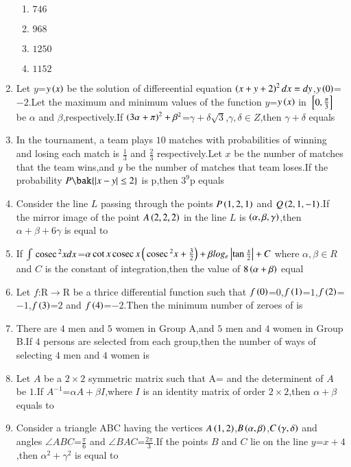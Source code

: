 \documentclass[journal]{IEEEtran}
\begin{document}
\begin{enumerate}[start=16]
    \begin{enumerate}
        \item $746$
        \item $968$
        \item $1250$
        \item $1152$
    \end{enumerate}
    \item Let $y$=$y\left(x\right)$ be the solution of differeential equation $\left(x+y+2\right)^2dx=dy$,$y\left(0\right)$=$-2$.Let the maximum and minimum values of the function $y$=$y\left(x\right)$ in ${}\left[0,\frac{\pi}{3}\right]$ be $\alpha$ and $\beta$,respectively.If $\left(3\alpha+\pi\right)^2+\beta^2$=$\gamma+\delta\sqrt{3}$,$\gamma,\delta \in Z$,then $\gamma+\delta$ equals
    \item In the tournament, a team plays $10$ matches with probabilities of winning and losing each match is $\frac{1}{3}$ and $\frac{2}{3}$ respectively.Let $x$ be the number of matches that the team wins,and $y$ be the number of matches that team loses.If the probability $P\bak{\abs{x-y} \leq 2}$ is p,then $3^9$p equals
    \item Consider the line $L$ passing through the points $P\left(1,2,1\right)$ and $Q\left(2,1,-1\right)$.If the mirror image of the point $A\left(2,2,2\right)$ in the line $L$ is $\left(\alpha,\beta,\gamma\right)$,then $\alpha+\beta+6\gamma$ is equal to
    \item If $\int\,\text{cosec}\,^2{x}dx$=$\alpha\cot{x}\,\text{cosec}\,{x}\left(\,\text{cosec}\,^2{x}+\frac{3}{2}\right)+\beta log_e\left\vert\tan{\frac{x}{2}}\right\vert+C$ where $\alpha,\beta \in R$ and $C$ is the constant of integration,then the value of $8\left(\alpha+\beta\right)$ equal
    \item Let $f$:R$\to$R be a thrice differential function such that $f\left(0\right)$=$0$,$f\left(1\right)$=$1$,$f\left(2\right)$=$-1$,$f\left(3\right)$=$2$ and $f\left(4\right)$=$-2$.Then the minimum number of zeroes of is 
    \item There are $4$ men and $5$ women in Group A,and $5$ men and $4$ women in Group B.If $4$ persons are selected from each group,then the number of ways of selecting $4$ men and $4$ women is
    \item Let $A$ be a $2\times2$ symmetric matrix such that A= and the determinent of $A$ be $1$.If $A^{-1}$=$\alpha A+\beta I$,where $I$ is an identity matrix of order $2\times2$,then $\alpha+\beta$ equals to
    \item Consider a triangle ABC having the vertices $A\left(1,2\right)$,$B\left(\alpha,\beta\right)$,$C\left(\gamma,\delta\right)$ and angles $\angle ABC$=$\frac{\pi}{6}$ and $\angle BAC$=$\frac{2\pi}{3}$.If the points $B$ and $C$ lie on the line $y$=$x+4$,then $\alpha^2+\gamma^2$ is equal to

\end{enumerate}
\end{document}
